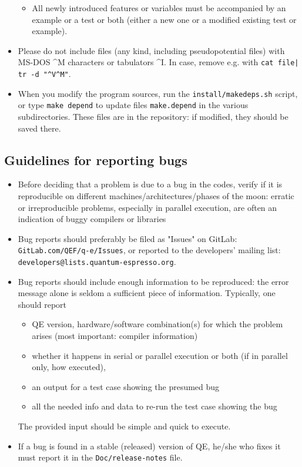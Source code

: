 \documentclass[12pt,a4paper]{article}
\def\qe{QE}
\begin{document}
\begin{itemize}
\begin{itemize}
\item All newly introduced features or variables must be
accompanied by an example or a test or both (either a
new one or a modified existing test or example).
\end{itemize}
\item Please do not include files (any kind, including
pseudopotential files) with MS-DOS \^{}M characters or
tabulators \^{}I. In case, remove e.g. with
\texttt{cat file| tr -d "\^{}V\^{}M"}.
\item When you modify the program sources, run the
\texttt{install/makedeps.sh}  script, or type \texttt{make depend}
to update files \texttt{make.depend} in the various
subdirectories. These files are in the repository:
if modified, they should be saved there.
\end{itemize}

\subsection{Guidelines for reporting bugs}

\label{SubSec:Bugs}
\begin{itemize}
\item Before deciding that a problem is due to a bug in the codes,
verify if it is reproducible on different machines/architectures/phases
of the moon: erratic or irreproducible problems, especially in parallel
execution, are often an indication of buggy compilers or libraries
\item Bug reports should preferably be filed as "Issues" on GitLab:
  \texttt{GitLab.com/QEF/q-e/Issues},
	or reported to the developers' mailing list:
		\texttt{developers@lists.quantum-espresso.org}.
\item Bug reports should include enough information to be reproduced:
the error message alone is seldom a sufficient piece of information.
Typically, one should report
\begin{itemize}
\item QE version, hardware/software combination(s) for which
     the problem arises (most important: compiler information)
\item whether it happens in serial or parallel execution or both
(if in parallel only, how executed),
\item an output for a test case showing the presumed bug
\item all the needed info and data to re-run the test case showing
the bug
\end{itemize}
The provided input should be simple and quick to execute.
\item If a bug is found in a stable (released) version of \qe,
  he/she who fixes it must report it in the \texttt{Doc/release-notes}
  file.
\end{itemize}
\end{document}
